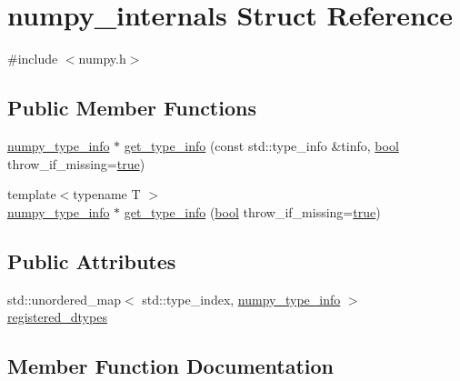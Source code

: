 \hypertarget{structnumpy__internals}{}\section{numpy\+\_\+internals Struct Reference}
\label{structnumpy__internals}


{\ttfamily \#include $<$numpy.\+h$>$}

\subsection*{Public Member Functions}
\begin{DoxyCompactItemize}
\item 
\mbox{\hyperlink{structnumpy__type__info}{numpy\+\_\+type\+\_\+info}} $\ast$ \mbox{\hyperlink{structnumpy__internals_a6ff780cd34d834366c24e5d00bec98da}{get\+\_\+type\+\_\+info}} (const std\+::type\+\_\+info \&tinfo, \mbox{\hyperlink{asdl_8h_af6a258d8f3ee5206d682d799316314b1}{bool}} throw\+\_\+if\+\_\+missing=\mbox{\hyperlink{asdl_8h_af6a258d8f3ee5206d682d799316314b1a08f175a5505a10b9ed657defeb050e4b}{true}})
\item 
{\footnotesize template$<$typename T $>$ }\\\mbox{\hyperlink{structnumpy__type__info}{numpy\+\_\+type\+\_\+info}} $\ast$ \mbox{\hyperlink{structnumpy__internals_a1e1af655e678c583636e925057358549}{get\+\_\+type\+\_\+info}} (\mbox{\hyperlink{asdl_8h_af6a258d8f3ee5206d682d799316314b1}{bool}} throw\+\_\+if\+\_\+missing=\mbox{\hyperlink{asdl_8h_af6a258d8f3ee5206d682d799316314b1a08f175a5505a10b9ed657defeb050e4b}{true}})
\end{DoxyCompactItemize}
\subsection*{Public Attributes}
\begin{DoxyCompactItemize}
\item 
std\+::unordered\+\_\+map$<$ std\+::type\+\_\+index, \mbox{\hyperlink{structnumpy__type__info}{numpy\+\_\+type\+\_\+info}} $>$ \mbox{\hyperlink{structnumpy__internals_aa842b07421e15ccd48ea036955fc84f4}{registered\+\_\+dtypes}}
\end{DoxyCompactItemize}


\subsection{Member Function Documentation}
\mbox{\label{structnumpy__internals_a6ff780cd34d834366c24e5d00bec98da}} 
